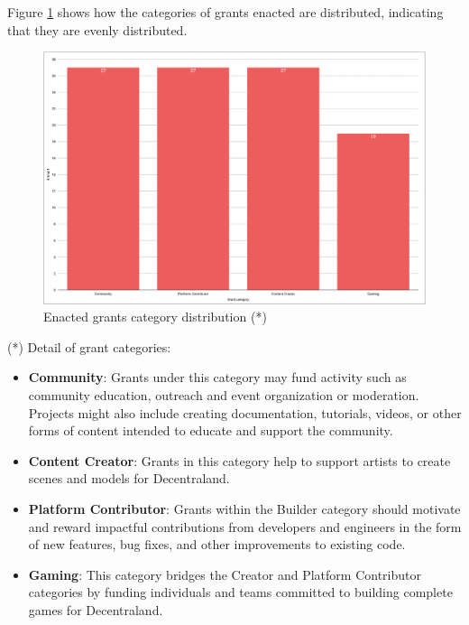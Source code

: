 \documentclass[MSE,Master,english]{twbook}%
\begin{document}
Figure \ref{fig:category_distribution} shows how the categories of grants enacted are distributed, indicating that they are evenly distributed.
\begin{figure}[H]
  \centering
  \includegraphics[width=\textwidth]{metrics/category_distribution.png}
  \caption{Enacted grants category distribution (*)}
  \label{fig:category_distribution}
\end{figure}

(*) Detail of grant categories\cite{grants}:
\begin{itemize}
  \item \textbf{Community}: Grants under this category may fund activity such as community education, outreach and event organization or moderation. Projects might also include creating documentation, tutorials, videos, or other forms of content intended to educate and support the community.
  \item \textbf{Content Creator}: Grants in this category help to support artists to create scenes and models for Decentraland.
  \item \textbf{Platform Contributor}: Grants within the Builder category should motivate and reward impactful contributions from developers and engineers in the form of new features, bug fixes, and other improvements to existing code.
  \item \textbf{Gaming}: This category bridges the Creator and Platform Contributor categories by funding individuals and teams committed to building complete games for Decentraland.
\end{itemize}
\end{document}
